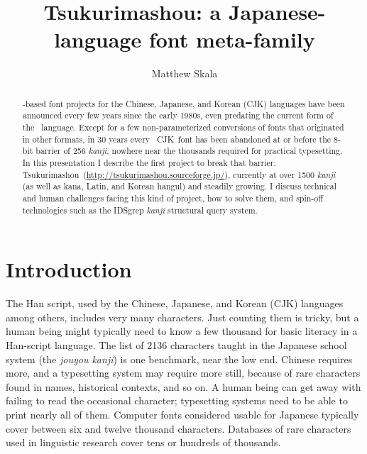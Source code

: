 \documentclass{ltugboat}
\title{Tsukurimashou: a Japanese-language font meta-family}
\author{Matthew Skala}
\def\CJK{CJK}
\begin{document}
\maketitle

\begin{abstract}
\MF-based font projects for the Chinese,
\linebreak%
Japanese, and Korean (\CJK)
languages have been announced every few years since the early 1980s,
even predating the current form of the \MF\ language.  Except for a few
non-parameterized conversions of fonts that originated in other formats,
in 30 years every \MF\ \CJK\ font has been abandoned at or before the
8-bit barrier of 256 \emph{kanji}, nowhere near the thousands required for
practical typesetting.  In this presentation I describe the first
project to break that barrier: $\!$Tsukurimashou\kern-0.7pt\
(\url{http://tsukurimashou.sourceforge.jp/}), currently at over 1500
\emph{kanji} (as well as kana, Latin, and Korean hangul) and steadily growing.
I discuss technical and human challenges facing this kind of project,
how to solve them, and spin-off technologies such as the IDSgrep
\emph{kanji} structural query system.
\end{abstract}


\section{Introduction}

The Han script, used by the Chinese, Japanese, and Korean (\CJK) languages
among others, includes 
\linebreak%
very many characters.  Just counting them is tricky,
but a human being might typically need to know a few thousand for basic
literacy in a Han-script language.  The list of 2136 characters taught in
the Japanese school system (the \emph{jouyou kanji}) is one benchmark, near
the low end.  Chinese requires
\linebreak
 more, and a typesetting system may require
more still, because of rare characters found in names, historical contexts,
and so on.  A human being can get away with failing to read the occasional
character; typesetting systems need to be able to print nearly all of them. 
Computer fonts considered usable for Japanese typically cover between six
and twelve thousand characters.  Databases of rare characters used in
linguistic research cover tens or hundreds of thousands.
\end{document}
